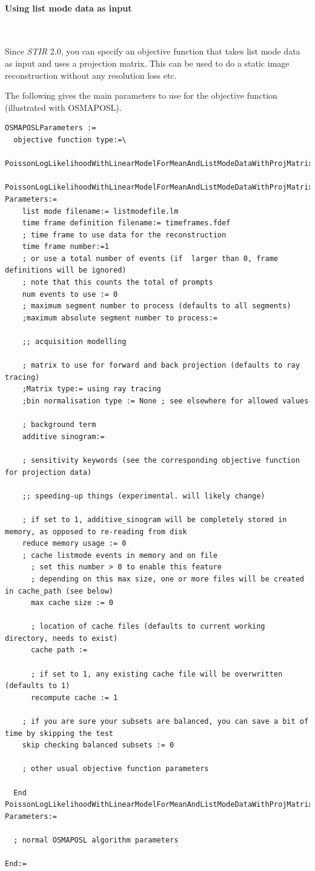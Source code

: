 \documentclass{article}
\newcommand{\subsubsubsection}[1]{\paragraph{#1}\mbox{} \\}
\begin{document}
{ \subsubsubsection{Using list mode data as input}
}
\label{sec:ListmodeIterativeAlgorithms}
Since \textit{STIR} 2.0, you can specify an objective function that takes list mode data as input
and uses a projection matrix. This can be used to do a static image reconstruction
without any resolution loss etc. 

The following gives the main parameters to use for the objective function (illustrated with OSMAPOSL).

{ \small
\begin{verbatim}
OSMAPOSLParameters :=
  objective function type:=\
     PoissonLogLikelihoodWithLinearModelForMeanAndListModeDataWithProjMatrixByBin
  PoissonLogLikelihoodWithLinearModelForMeanAndListModeDataWithProjMatrixByBin Parameters:=
    list mode filename:= listmodefile.lm
    time frame definition filename:= timeframes.fdef
    ; time frame to use data for the reconstruction
    time frame number:=1
    ; or use a total number of events (if  larger than 0, frame definitions will be ignored)
    ; note that this counts the total of prompts
    num events to use := 0
    ; maximum segment number to process (defaults to all segments)
    ;maximum absolute segment number to process:=

    ;; acquisition modelling

    ; matrix to use for forward and back projection (defaults to ray tracing)
    ;Matrix type:= using ray tracing
    ;bin normalisation type := None ; see elsewhere for allowed values

    ; background term
    additive sinogram:=

    ; sensitivity keywords (see the corresponding objective function for projection data)

    ;; speeding-up things (experimental. will likely change)

    ; if set to 1, additive_sinogram will be completely stored in memory, as opposed to re-reading from disk
    reduce memory usage := 0
    ; cache listmode events in memory and on file
      ; set this number > 0 to enable this feature
      ; depending on this max size, one or more files will be created in cache_path (see below)
      max cache size := 0

      ; location of cache files (defaults to current working directory, needs to exist)
      cache path :=

      ; if set to 1, any existing cache file will be overwritten (defaults to 1)
      recompute cache := 1

    ; if you are sure your subsets are balanced, you can save a bit of time by skipping the test
    skip checking balanced subsets := 0

    ; other usual objective function parameters 

  End PoissonLogLikelihoodWithLinearModelForMeanAndListModeDataWithProjMatrixByBin Parameters:=

  ; normal OSMAPOSL algorithm parameters 

End:=
\end{verbatim}
}
\end{document}
